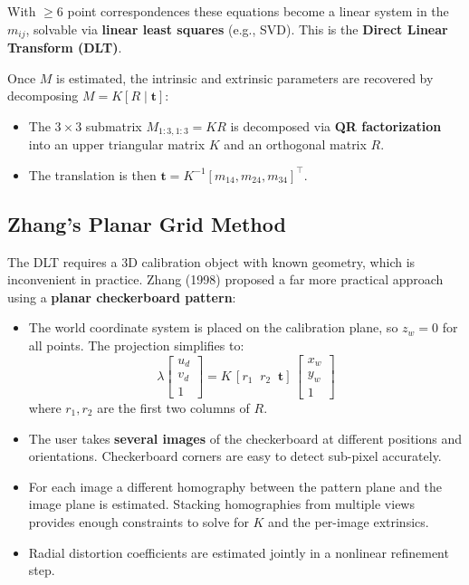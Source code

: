 \documentclass[11pt,a4paper]{article}
\theoremstyle{definition}
\theoremstyle{plain}
\theoremstyle{remark}
\newcommand{\p}[1]{\mathbf{#1}}             %
\begin{document}
With $\geq 6$ point correspondences these equations become a linear system in the $m_{ij}$, solvable via \textbf{linear least squares} (e.g., SVD). This is the \textbf{Direct Linear Transform (DLT)}.

Once $M$ is estimated, the intrinsic and extrinsic parameters are recovered by decomposing $M = K[R \mid \p{t}]$:

\begin{itemize}
    \item The $3 \times 3$ submatrix $M_{1:3,1:3} = KR$ is decomposed via \textbf{QR factorization} into an upper triangular matrix $K$ and an orthogonal matrix $R$.
    \item The translation is then $\p{t} = K^{-1}[m_{14}, m_{24}, m_{34}]^\top$.
\end{itemize}

\subsection{Zhang's Planar Grid Method}

The DLT requires a 3D calibration object with known geometry, which is inconvenient in practice. Zhang (1998) proposed a far more practical approach using a \textbf{planar checkerboard pattern}:

\begin{itemize}
    \item The world coordinate system is placed on the calibration plane, so $z_w = 0$ for all points. The projection simplifies to:
    \[
    \lambda \begin{bmatrix} u_d \\ v_d \\ 1 \end{bmatrix} = K\,[r_1 \;\; r_2 \;\; \p{t}]\,\begin{bmatrix} x_w \\ y_w \\ 1 \end{bmatrix}
    \]
    where $r_1, r_2$ are the first two columns of $R$.
    \item The user takes \textbf{several images} of the checkerboard at different positions and orientations. Checkerboard corners are easy to detect sub-pixel accurately.
    \item For each image a different homography between the pattern plane and the image plane is estimated. Stacking homographies from multiple views provides enough constraints to solve for $K$ and the per-image extrinsics.
    \item Radial distortion coefficients are estimated jointly in a nonlinear refinement step.
\end{itemize}
\end{document}
